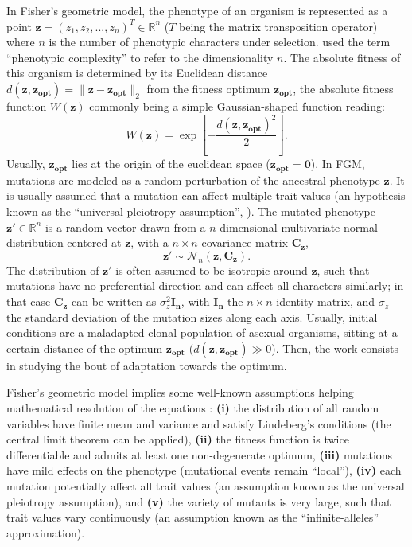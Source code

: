 In Fisher's geometric model, the phenotype of an organism is represented as a point $\boldsymbol{z} = (z_1,z_2,...,z_n)^T \in \mathbb{R}^n$ ($T$ being the matrix transposition operator) where $n$ is the number of phenotypic characters under selection.
\cite{fisher-1930} used the term ``phenotypic complexity'' to refer to the dimensionality $n$.
The absolute fitness of this organism is determined by its Euclidean distance $d(\boldsymbol{z}, \boldsymbol{z_{opt}}) = \lVert \boldsymbol{z}-\boldsymbol{z_{opt}} \rVert_2$ from the fitness optimum $\boldsymbol{z_{opt}}$, the absolute fitness function $W(\boldsymbol{z})$ commonly being a simple Gaussian-shaped function reading:
\begin{equation}
W(\boldsymbol{z}) = \exp \left[ -\dfrac{d(\boldsymbol{z}, \boldsymbol{z_{opt}})^2}{2} \right].
\label{eq:fitness_function}
\end{equation}
Usually, $\boldsymbol{z_{opt}}$ lies at the origin of the euclidean space ($\boldsymbol{z_{opt}}=\boldsymbol{0}$).
In FGM, mutations are modeled as a random perturbation of the ancestral phenotype $\boldsymbol{z}$. It is usually assumed that a mutation can affect multiple trait values (an hypothesis known as the ``universal pleiotropy assumption'', \citealt{paaby-rockman-2013}). The mutated phenotype $\boldsymbol{z'} \in \mathbb{R}^n$ is a random vector drawn from a $n$-dimensional multivariate normal distribution centered at $\boldsymbol{z}$, with a $n \times n$ covariance matrix $\boldsymbol{C_z}$,
\begin{equation}
\boldsymbol{z'} \sim \mathcal{N}_n(\boldsymbol{z}, \boldsymbol{C_z}).
\label{eq:classical_mutation_scheme}
\end{equation}
The distribution of $\boldsymbol{z'}$ is often assumed to be isotropic around $\boldsymbol{z}$, such that mutations have no preferential direction and can affect all characters similarly; in that case $\boldsymbol{C_z}$ can be written as $\sigma_z^2 \boldsymbol{I_n}$, with $\boldsymbol{I_n}$ the $n \times n$ identity matrix, and $\sigma_z$ the standard deviation of the mutation sizes along each axis. Usually, initial conditions are a maladapted clonal population of asexual organisms, sitting at a certain distance of the optimum $\boldsymbol{z_{opt}}$ ($d(\boldsymbol{z}, \boldsymbol{z_{opt}}) \gg 0$). Then, the work consists in studying the bout of adaptation towards the optimum.

Fisher's geometric model implies some well-known assumptions helping mathematical resolution of the equations \citep{martin-2014}: \textbf{(i)} the distribution of all random variables have finite mean and variance and satisfy Lindeberg's conditions (the central limit theorem can be applied), \textbf{(ii)} the fitness function is twice differentiable and admits at least one non-degenerate optimum, \textbf{(iii)} mutations have mild effects on the phenotype (mutational events remain ``local''), \textbf{(iv)} each mutation potentially affect all trait values (an assumption known as the universal pleiotropy assumption), and \textbf{(v)} the variety of mutants is very large, such that trait values vary continuously (an assumption known as the ``infinite-alleles'' approximation).

